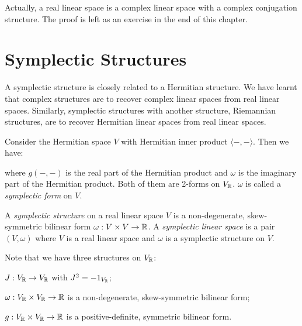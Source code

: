 Actually, a real linear space is a complex linear space with a complex conjugation structure. The proof is left as an exercise in the end of this chapter.

\section{Symplectic Structures}
A symplectic structure is closely related to a Hermitian structure. We have learnt that complex structures are to recover complex linear spaces from real linear spaces. Similarly, symplectic structures with another structure, Riemannian structures, are to recover Hermitian linear spaces from real linear spaces.

Consider the Hermitian space $V$ with Hermitian inner product $\langle -, - \rangle$. Then we have:
\begin{center}
\end{center}
where $g(-, -)$ is the real part of the Hermitian product and $\omega$ is the imaginary part of the Hermitian product. Both of them are 2-forms on $V_{\operatorname{\mathbb{R}}}$. $\omega$ is called a \emph{symplectic form} on $V$.

\begin{definition}\label{def:symplectic_structure}
	A \emph{symplectic structure} on a real linear space $V$ is a non-degenerate, skew-symmetric bilinear form $\omega : V \times V \to \operatorname{\mathbb{R}}$. A \emph{symplectic linear space} is a pair $(V, \omega)$ where $V$ is a real linear space and $\omega$ is a symplectic structure on $V$.
\end{definition}

Note that we have three structures on $V_{\operatorname{\mathbb{R}}}$:
\begin{description}[leftmargin=!, labelwidth=\widthof{\bfseries Riemannian Structure:~}, font=\color{ustblue}, topsep=\baselineskip]
	\item[Complex Structure] $J : V_{\operatorname{\mathbb{R}}} \to V_{\operatorname{\mathbb{R}}}$ with $J^2 = -1_{V_{\operatorname{\mathbb{R}}}}$;
	\item[Symplectic Structure] $\omega : V_{\operatorname{\mathbb{R}}} \times V_{\operatorname{\mathbb{R}}} \to \operatorname{\mathbb{R}}$ is a non-degenerate, skew-symmetric bilinear form;
	\item[Riemannian Structure] $g : V_{\operatorname{\mathbb{R}}} \times V_{\operatorname{\mathbb{R}}} \to \operatorname{\mathbb{R}}$ is a positive-definite, symmetric bilinear form.
\end{description}

